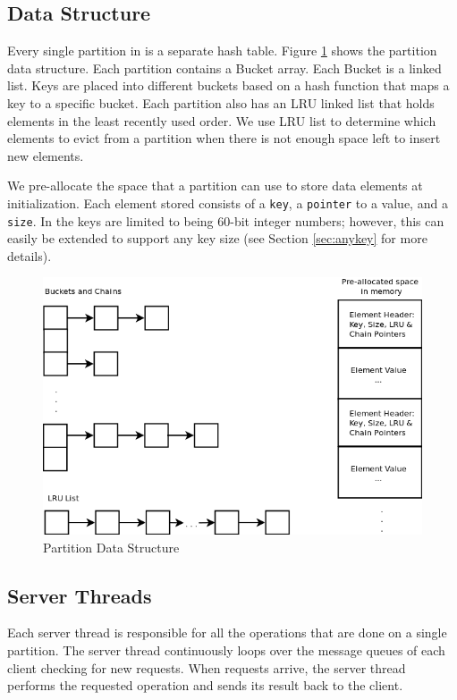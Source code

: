 \subsection{Data Structure}
\label{sec:datastructure}

Every single partition in \cphash{} is a separate hash table. Figure \ref{fig:partition} shows the partition data structure.
Each partition contains a Bucket array. Each Bucket is a linked list. Keys are placed into different buckets based on a hash 
function that maps a key to a specific bucket. Each partition also has an LRU linked list that holds 
elements in the least recently used order. We use LRU list to determine which elements to evict from
a partition when there is not enough space left to insert new elements.

We pre-allocate the space that a partition can use to store data elements at initialization. 
Each element stored consists of a \texttt{key}, a \texttt{pointer} to a value, and a \texttt{size}. 
In \cphash{} the keys are limited to being 60-bit integer numbers; however, this can easily be 
extended to support any key size (see Section \ref{sec:anykey} for more details). 

\begin{figure}[!ht]
  \centering
  \includegraphics[width=0.8\linewidth]{figs/partition.png}
  \caption{Partition Data Structure}
  \label{fig:partition}
\end{figure}

\subsection{Server Threads}
\label{sec:serverthreads}

Each server thread is responsible for all the operations that are done on a single partition. 
The server thread continuously loops over the message queues of each client checking for new requests. When requests arrive, the 
server thread performs the requested operation and sends its result back to the client. 

